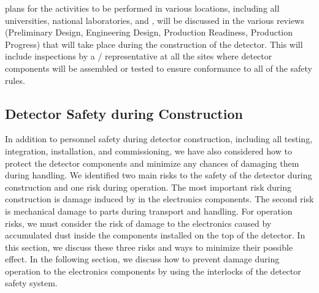  plans for the activities to be performed in various
locations, including all universities, national laboratories,
and , will be discussed in the 
various reviews (Preliminary Design, Engineering Design, Production 
Readiness, Production Progress) that will take place during the construction of the detector.
This will include inspections by a / 
representative at all the sites where detector components will be 
assembled or tested to ensure conformance to all of the safety
rules.

\subsection{Detector Safety during Construction}
\label{sec:fdsp-tpcelec-safety-detcon}


In addition to personnel safety during detector
construction, including all testing, 
integration, installation, and commissioning, we have also
considered how to protect the detector
components and minimize any chances of damaging
them during handling. We identified two main risks 
to the safety of the detector during construction and one risk during
operation. The most important risk during construction is damage 
induced by  in the 
electronics components. The second risk is mechanical damage to 
parts during transport and handling. For operation risks, we
must consider the risk of damage to the electronics 
caused by accumulated dust inside the components
installed on the top of the detector. In this section, 
we discuss these three risks and ways to minimize their possible 
effect. In the following section, we discuss how to prevent
damage during operation to the  electronics components 
by using the interlocks of the detector safety system.


